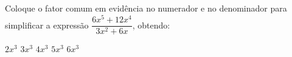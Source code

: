 Coloque o fator comum em evidência no numerador e no denominador para simplificar a expressão $\dfrac{6x^5+12x^4}{3x^2+6x}$, obtendo:

$2x^3$
$3x^3$
$4x^3$
$5x^3$
$6x^3$


